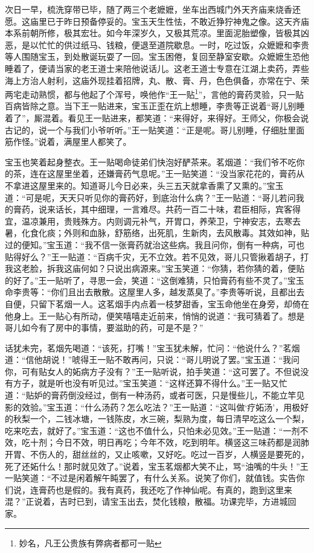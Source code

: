 \documentclass[12pt,oneside]{book}
\begin{document}
次日一早，梳洗穿带已毕，随了两三个老嬷嬷，坐车出西城门外天齐庙来烧香还愿。这庙里已于昨日预备停妥的。宝玉天生性怯，不敢近狰狞神鬼之像。这天齐庙本系前朝所修，极其宏壮。如今年深岁久，又极其荒凉。里面泥胎塑像，皆极其凶恶，是以忙忙的供过纸马、钱粮，便退至道院歇息。一时，吃过饭，众嬷嬷和李贵等人围随宝玉，到处散诞玩耍了一回。宝玉困倦，复回至静室安歇。众嬷嬷生恐他睡着了，便请当家的老王道士来陪他说话儿。这老王道士专意在江湖上卖药，弄些海上方治人射利，这庙外现挂着招牌，丸、散、膏、丹，色色俱备，亦常在宁、荣两宅走动熟惯，都与他起了个浑号，唤他作“王一贴\footnote{妙名，凡王公贵族有弊病者都可一贴}”，言他的膏药灵验，只一贴百病皆除之意。当下王一贴进来，宝玉正歪在炕上想睡，李贵等正说着“哥儿别睡着了”，厮混着。看见王一贴进来，都笑道：“来得好，来得好。王师父，你极会说古记的，说一个与我们小爷听听。”王一贴笑道：“正是呢。哥儿别睡，仔细肚里面筋作怪。”说着，满屋里人都笑了。

宝玉也笑着起身整衣。王一贴喝命徒弟们快泡好酽茶来。茗烟道：“我们爷不吃你的茶，连在这屋里坐着，还嫌膏药气息呢。”王一贴笑道：“没当家花花的，膏药从不拿进这屋里来的。知道哥儿今日必来，头三五天就拿香熏了又熏的。”宝玉道：“可是呢，天天只听见你的膏药好，到底治什么病？”王一贴道：“哥儿若问我的膏药，说来话长，其中细理，一言难尽。共药一百二十味，君臣相际，宾客得宜，温凉兼用，贵贱殊方。内则调元补气，开胃口，养荣卫，宁神安志，去寒去暑，化食化痰；外则和血脉，舒筋络，出死肌，生新肉，去风散毒。其效如神，贴过的便知。”宝玉道：“我不信一张膏药就治这些病。我且问你，倒有一种病，可也贴得好么？”王一贴道：“百病千灾，无不立效。若不见效，哥儿只管揪着胡子，打我这老脸，拆我这庙何如？只说出病源来。”宝玉笑道：“你猜，若你猜的着，便贴的好了。”王一贴听了，寻思一会，笑道：“这倒难猜，只怕膏药有些不灵了。”宝玉命李贵等：“你们且出去散散。这屋里人多，越发蒸臭了。”李贵等听说，且都出去自便，只留下茗烟一人。这茗烟手内点着一枝梦甜香，宝玉命他坐在身旁，却倚在他身上。王一贴心有所动，便笑嘻嘻走近前来，悄悄的说道：“我可猜着了。想是哥儿如今有了房中的事情，要滋助的药，可是不是？”

话犹未完，茗烟先喝道：“该死，打嘴！”宝玉犹未解，忙问：“他说什么？”茗烟道：“信他胡说！”唬得王一贴不敢再问，只说：“哥儿明说了罢。”宝玉道：“我问你，可有贴女人的妬病方子没有？”王一贴听说，拍手笑道：“这可罢了。不但说没有方子，就是听也没有听见过。”宝玉笑道：“这样还算不得什么。”王一贴又忙道：“贴妒的膏药倒没经过，倒有一种汤药，或者可医，只是慢些儿，不能立竿见影的效验。”宝玉道：“什么汤药？怎么吃法？”王一贴道：“这叫做‘疗妬汤’，用极好的秋梨一个，二钱冰塘，一钱陈皮，水三碗，梨熟为度，每日清早吃这么一个梨，吃来吃去，就好了。”宝玉道：“这也不值什么，只怕未必见效。”王一贴道：“一剂不效，吃十剂；今日不效，明日再吃；今年不效，吃到明年。横竖这三味药都是润肺开胃、不伤人的，甜丝丝的，又止咳嗽，又好吃。吃过一百岁，人横竖是要死的，死了还妬什么！那时就见效了。”说着，宝玉茗烟都大笑不止，骂“油嘴的牛头！”王一贴笑道：“不过是闲着解午盹罢了，有什么关系。说笑了你们，就值钱。实告你们说，连膏药也是假的。我有真药，我还吃了作神仙呢。有真的，跑到这里来混？”正说着，吉时已到，请宝玉出去，焚化钱粮，散福。功课完毕，方进城回家。
\end{document}
